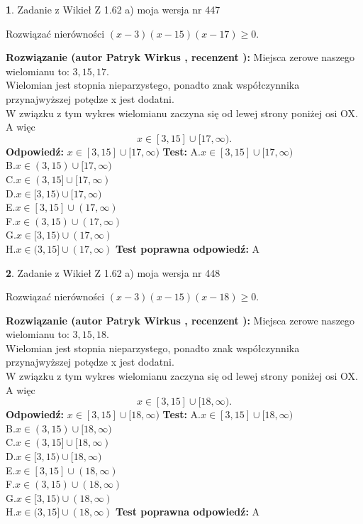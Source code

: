 \documentclass[12pt, a4paper]{article}
\theoremstyle{definition} %
\newtheorem{zad}{}
\newcommand{\zadStart}[1]{\begin{zad}#1\newline}
\newcommand{\zadStop}{\end{zad}}
\newcommand{\rozwStart}[2]{\noindent \textbf{Rozwiązanie (autor #1 , recenzent #2): }\newline}
\newcommand{\rozwStop}{\newline}
\newcommand{\odpStart}{\noindent \textbf{Odpowiedź:}\newline}
\newcommand{\odpStop}{\newline}
\newcommand{\testStart}{\noindent \textbf{Test:}\newline}
\newcommand{\testStop}{\newline}
\newcommand{\kluczStart}{\noindent \textbf{Test poprawna odpowiedź:}\newline}
\newcommand{\kluczStop}{\newline}
\begin{document}
\zadStart{Zadanie z Wikieł Z 1.62 a) moja wersja nr 447}

Rozwiązać nierówności $(x-3)(x-15)(x-17)\ge0$.
\zadStop
\rozwStart{Patryk Wirkus}{}
Miejsca zerowe naszego wielomianu to: $3, 15, 17$.\\
Wielomian jest stopnia nieparzystego, ponadto znak współczynnika przy\linebreak najwyższej potędze x jest dodatni.\\ W związku z tym wykres wielomianu zaczyna się od lewej strony poniżej osi OX. A więc $$x \in [3,15] \cup [17,\infty).$$
\rozwStop
\odpStart
$x \in [3,15] \cup [17,\infty)$
\odpStop
\testStart
A.$x \in [3,15] \cup [17,\infty)$\\
B.$x \in (3,15) \cup [17,\infty)$\\
C.$x \in (3,15] \cup [17,\infty)$\\
D.$x \in [3,15) \cup [17,\infty)$\\
E.$x \in [3,15] \cup (17,\infty)$\\
F.$x \in (3,15) \cup (17,\infty)$\\
G.$x \in [3,15) \cup (17,\infty)$\\
H.$x \in (3,15] \cup (17,\infty)$
\testStop
\kluczStart
A
\kluczStop



\zadStart{Zadanie z Wikieł Z 1.62 a) moja wersja nr 448}

Rozwiązać nierówności $(x-3)(x-15)(x-18)\ge0$.
\zadStop
\rozwStart{Patryk Wirkus}{}
Miejsca zerowe naszego wielomianu to: $3, 15, 18$.\\
Wielomian jest stopnia nieparzystego, ponadto znak współczynnika przy\linebreak najwyższej potędze x jest dodatni.\\ W związku z tym wykres wielomianu zaczyna się od lewej strony poniżej osi OX. A więc $$x \in [3,15] \cup [18,\infty).$$
\rozwStop
\odpStart
$x \in [3,15] \cup [18,\infty)$
\odpStop
\testStart
A.$x \in [3,15] \cup [18,\infty)$\\
B.$x \in (3,15) \cup [18,\infty)$\\
C.$x \in (3,15] \cup [18,\infty)$\\
D.$x \in [3,15) \cup [18,\infty)$\\
E.$x \in [3,15] \cup (18,\infty)$\\
F.$x \in (3,15) \cup (18,\infty)$\\
G.$x \in [3,15) \cup (18,\infty)$\\
H.$x \in (3,15] \cup (18,\infty)$
\testStop
\kluczStart
A
\kluczStop
\end{document}
